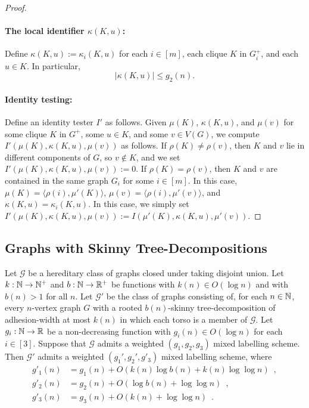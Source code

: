 \documentclass{patmorin}
\renewcommand{\leq}{\leqslant}
\newcommand{\david}[1]{\noindent{\color{orange} DW: #1}}
\newcommand{\vida}[1]{\noindent{\color{pink} VD: #1}}
\newcommand{\Oh}{O}
\begin{document}
\begin{proof}
  \paragraph{\boldmath The local identifier $\kappa(K,u)$:}
  Define $\kappa(K,u) := \kappa_i(K,u)$ for each $i\in[m]$, each clique $K$ in $G^+_i$, and each $u\in K$. In particular,
  \[
    |\kappa(K,u)| \leq g_2(n).
  \]

  \paragraph{Identity testing:}
  Define an identity tester $I'$ as follows.
  Given $\mu(K)$, $\kappa(K,u)$, and $\mu(v)$ for some clique $K$ in $G^+$, some $u\in K$, and some $v\in V(G)$, we compute $I'(\mu(K),\kappa(K,u),\mu(v))$ as follows.
  If $\rho(K)\neq\rho(v)$, then $K$ and $v$ lie in different components of $G$, so $v\not\in K$, and we set $I'(\mu(K),\kappa(K,u),\mu(v)):=0$.  If $\rho(K)=\rho(v)$, then $K$ and $v$ are contained in the same graph $G_i$ for some $i\in[m]$. In this case, 
  $\mu(K)=\langle\rho(i),\mu'(K)\rangle$,
  $\mu(v)=\langle\rho(i),\mu'(v)\rangle$, and
  $\kappa(K,u)=\kappa_i(K,u)$.
  In this case, we simply set $I'(\mu(K),\kappa(K,u),\mu(v)) := I(\mu'(K),\kappa(K,u),\mu'(v))$.
\end{proof}

\subsection{Graphs with Skinny Tree-Decompositions}
\label{sec:skinny}

\begin{lem}\label{skinny_labelling}
  Let $\mathcal{G}$ be a hereditary class of graphs closed under taking disjoint union.
  Let $k:\mathbb{N}\to\mathbb{N}^+$ and $b:\mathbb{N}\to\mathbb{R}^+$ be functions with $k(n)\in\Oh(\log n)$ and with $b(n)>1$ for all $n$.
  Let $\mathcal{G}'$ be the class of graphs consisting of, for each $n\in\mathbb{N}$, every $n$-vertex graph $G$ with a rooted $b(n)$-skinny tree-decomposition of adhesion-width at most $k(n)$ in which each torso is a member of $\mathcal{G}$.
  Let $g_i:\mathbb{N}\to\mathbb{R}$ be a non-decreasing function with $g_i(n)\in \Oh(\log n)$ for each $i\in[3]$.
  Suppose that $\mathcal{G}$ admits a weighted $(g_1,g_2,g_3)$ mixed labelling scheme.
  Then $\mathcal{G}'$ admits a weighted $(g_1',g_2',g'_3)$ mixed labelling scheme, where
  \begin{align*}
    g'_1(n)
     & = g_1(n) + \Oh(k(n)\log b(n) + k(n) \log\log n)\enspace, \\
    g'_2(n)
     & = g_2(n)+\Oh(\log b(n)+\log\log n)\enspace,              \\
    g'_3(n)
     & = g_3(n) + \Oh(k(n) + \log\log n)\enspace.
  \end{align*}
\end{lem}
\end{document}
